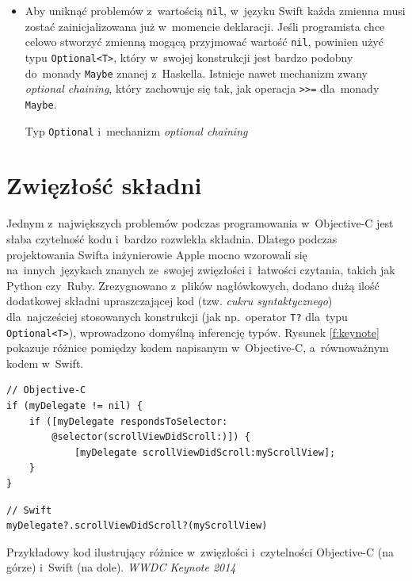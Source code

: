 \documentclass[mgr, shortabstract]{iithesis}
\newcommand{\swiftlisting}[2]{
    \swiftcode{src/#1.swift}
    \begin{listing}[ht]
      \caption{#2}
      \label{l:#1}
    \end{listing}
}
\begin{document}
\begin{itemize}
    \item Aby uniknąć problemów z~wartością \texttt{nil}, w~języku Swift każda zmienna musi zostać zainicjalizowana już w~momencie deklaracji. Jeśli programista chce celowo stworzyć zmienną mogącą przyjmować wartość \texttt{nil}, powinien użyć typu \texttt{Optional<T>}, który w~swojej konstrukcji jest bardzo podobny do~monady \texttt{Maybe} znanej z~Haskella. Istnieje nawet mechanizm zwany \textit{optional chaining}, który zachowuje się tak, jak operacja \texttt{>>=} dla~monady \texttt{Maybe}.

    \swiftlisting
        {2_optional}
        {Typ \texttt{Optional} i~mechanizm \textit{optional chaining}}

\end{itemize}

\section{Zwięzłość składni}
\label{s:zwiezlosc_skladni}

Jednym z~największych problemów podczas programowania w~Objective-C jest słaba czytelność kodu i~bardzo rozwlekła składnia. Dlatego podczas projektowania Swifta inżynierowie Apple mocno wzorowali się na~innych~językach znanych ze~swojej zwięzłości i~łatwości czytania, takich jak Python czy~Ruby. Zrezygnowano z~plików nagłówkowych, dodano dużą ilość dodatkowej składni upraszczającej kod (tzw. \textit{cukru syntaktycznego}) dla~najcześciej stosowanych konstrukcji (jak np.~operator \texttt{T?} dla~typu \texttt{Optional<T>}), wprowadzono domyślną inferencję typów. Rysunek \ref{f:keynote} pokazuje różnice pomiędzy kodem napisanym w~Objective-C, a~równoważnym kodem w~Swift.

\begin{listing}[ht]
\begin{verbatim}
// Objective-C
if (myDelegate != nil) {
    if ([myDelegate respondsToSelector:
        @selector(scrollViewDidScroll:)]) {
            [myDelegate scrollViewDidScroll:myScrollView];
    }
}
\end{verbatim}

\begin{verbatim}
// Swift
myDelegate?.scrollViewDidScroll?(myScrollView)
\end{verbatim}
\caption{Przykładowy kod ilustrujący różnice w~zwięzłości i~czytelności Objective-C (na górze) i~Swift (na dole). \textit{WWDC Keynote 2014}}
\label{f:keynote}
\end{listing}
\end{document}
